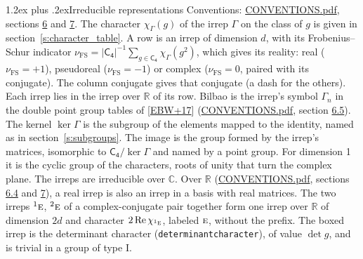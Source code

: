 \documentclass[10pt,a4paper]{article}
\makeatletter
\renewcommand\section{\@startsection{section}{1}{\z@}{-3ex plus -1ex minus -.2ex}%
  {1.2ex plus .2ex}{\normalfont\large\sffamily\bfseries\color{parttitle}}}
\numberwithin{equation}{section}
\newcommand{\grp}[1]{\mathsf{#1}}
\newcommand{\irr}[1]{\text{\normalfont\scshape #1}}
\newcommand{\conjpair}[1]{{}^{#1}}
\newcommand{\irchar}[1]{\chi_{#1}}
\newcommand{\fsind}{\nu_{\mathrm{FS}}}
\makeatother
\begin{document}
\section{Irreducible representations}\label{s:irreps}
Conventions: \href{../../CONVENTIONS.pdf}{CONVENTIONS.pdf}, sections \href{../../CONVENTIONS.pdf\#conv.6}{6} and \href{../../CONVENTIONS.pdf\#conv.7}{7}.
\leavevmode\label{n:function.character}\label{n:irrep.Gamma}The character $\irchar{\Gamma}(g)$ of the irrep $\Gamma$ on the class of $g$ is given in section~\ref{s:character_table}.
\leavevmode\label{n:index.dimension}\label{n:index.frobenius}\label{n:head.irrep}\label{n:head.reality}A row is an irrep of dimension $d$, with its Frobenius--Schur indicator $\fsind = |\grp{C_{4}}|^{-1}\allowbreak\sum_{g\in\grp{C_{4}}}\irchar{\Gamma}(g^2)$, which gives its reality: real ($\fsind = +1$), pseudoreal ($\fsind = -1$) or complex ($\fsind = 0$, paired with its conjugate). \label{n:head.conjugate}The column conjugate gives that conjugate (a dash for the others). \label{n:head.over.real}Each irrep lies in the irrep over $\mathbb{R}$ of its row. \label{n:head.bilbao}\label{n:irrep.alias.gamma}Bilbao is the irrep's symbol $\Gamma_n$ in the double point group tables of [\href{../../../REFERENCES.pdf\#ref.EBW+17}{EBW+17}] (\href{../../CONVENTIONS.pdf}{CONVENTIONS.pdf}, section \href{../../CONVENTIONS.pdf\#conv.6.5}{6.5}). \label{n:head.kernel}The kernel $\ker\Gamma$ is the subgroup of the elements mapped to the identity, named as in section~\ref{s:subgroups}. \label{n:head.image}The image is the group formed by the irrep's matrices, isomorphic to $\grp{C_{4}}/\ker\Gamma$ and named by a point group. For dimension 1 it is the cyclic group of the characters, roots of unity that turn the complex plane. The irreps are irreducible over $\mathbb{C}$. Over $\mathbb{R}$ (\href{../../CONVENTIONS.pdf}{CONVENTIONS.pdf}, sections \href{../../CONVENTIONS.pdf\#conv.6.4}{6.4} and \href{../../CONVENTIONS.pdf\#conv.7}{7}), a real irrep is also an irrep in a basis with real matrices. The two irreps $\conjpair{1}\irr{e}$, $\conjpair{2}\irr{e}$ of a complex-conjugate pair together form one irrep over $\mathbb{R}$ of dimension $2d$ and character $2\operatorname{Re}\irchar{\conjpair{1}\irr{e}}$, labeled $\irr{e}$, without the prefix. \label{n:mark.determinant}The boxed irrep is the determinant character (\texttt{determinantcharacter}), of value $\det g$, and is trivial in a group of type I.
\setlength{\emergencystretch}{2em}\par\setlength{\emergencystretch}{0pt}
\end{document}
